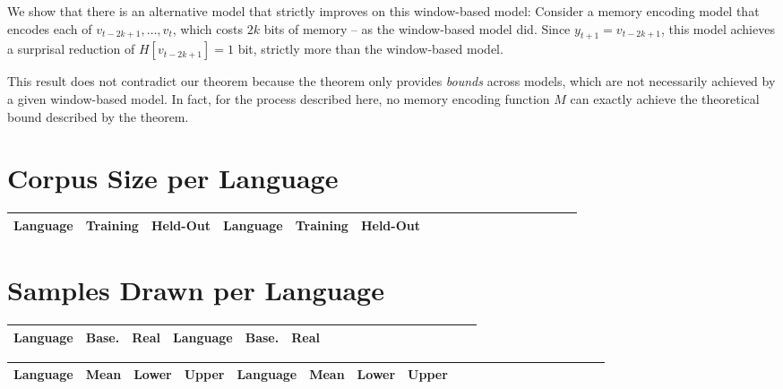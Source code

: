 \documentclass[11pt,letterpaper]{article}
\newcounter{theorem}
\begin{document}
We show that there is an alternative model that strictly improves on this window-based model:
Consider a memory encoding model that encodes each of $v_{t-2k+1}, \dots, v_{t}$, which costs $2k$ bits of memory -- as the window-based model did.
Since $y_{t+1} = v_{t-2k+1}$, this model achieves a surprisal reduction of $H[v_{t-2k+1}] = 1$ bit, strictly more than the window-based model.


This result does not contradict our theorem because the theorem only provides \emph{bounds} across models, which are not necessarily achieved by a given window-based model.
In fact, for the process described here, no memory encoding function $M$ can exactly achieve the theoretical bound described by the theorem.

\section{Corpus Size per Language}

\begin{center}
\begin{longtable}{l|ll||l|llllllllllllll}
	Language & Training & Held-Out & 	Language & Training & Held-Out\\ \hline

\end{longtable}
	\label{tab:corpora}
\end{center}

\section{Samples Drawn per Language}

\begin{center}
\begin{longtable}{l|ll||l|llllllllllllll}
	Language & Base. & Real & Language & Base. & Real \\ \hline

\end{longtable}
	\label{tab:samples}
\end{center}



\begin{center}
\begin{longtable}{l|lll||l|lllllllllllllll}
	Language & Mean & Lower & Upper & Language & Mean & Lower & Upper \\ \hline

\end{longtable}
	\label{tab:boot-g}
\end{center}
\end{document}
